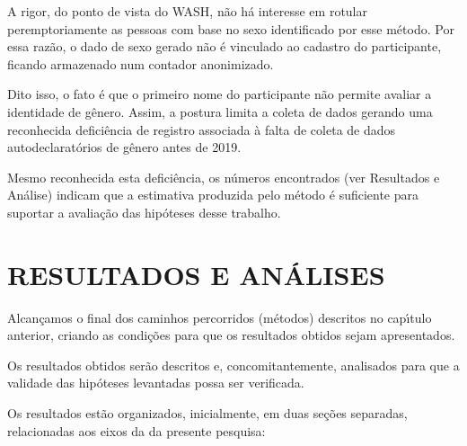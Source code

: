 \documentclass[
12pt,		%
openright,	%
twoside,  %
a4paper,			%
chapter=TITLE,		%
english,			%
french,				%
spanish,			%
brazil				%
]{USPSC-classe/USPSC}
\begin{document}
A rigor, do ponto de vista do WASH, n\~ao h\'a interesse em rotular peremptoriamente as pessoas com base no sexo identificado por esse m\'etodo. Por essa raz\~ao, o dado de sexo gerado n\~ao \'e vinculado ao cadastro do participante, ficando armazenado num contador anonimizado.









Dito isso, o fato \'e que o primeiro nome do participante n\~ao permite avaliar a identidade de g\^enero. Assim, a postura limita a coleta de dados gerando uma reconhecida defici\^encia de registro associada \`a falta de coleta de dados autodeclarat\'orios de g\^enero antes de 2019.









Mesmo reconhecida esta defici\^encia, os n\'umeros encontrados (ver Resultados e An\'alise) indicam que a estimativa produzida pelo m\'etodo \'e suficiente para suportar a avalia\c{c}\~ao das hip\'oteses desse trabalho.









\chapter[RESULTADOS E AN\'ALISES]{RESULTADOS E AN\'ALISES}\label{RESULTADOS E AN\'ALISES}
Alcan\c{c}amos o final dos caminhos percorridos (m\'etodos) descritos no cap\'{\i}tulo anterior, criando as condi\c{c}\~oes para que os resultados obtidos sejam apresentados.









Os resultados obtidos ser\~ao descritos e, concomitantemente, analisados para que a validade das hip\'oteses levantadas possa ser verificada.









Os resultados est\~ao organizados, inicialmente, em duas se\c{c}\~oes separadas, relacionadas aos eixos da da presente pesquisa:
\end{document}
